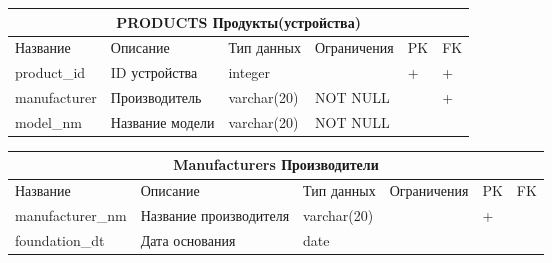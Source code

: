 \documentclass{article}
\begin{document}
\begin{tabular}{ |p{4cm}|p{4cm}|p{2.5cm}|p{3.5cm}|p{2cm}|p{1cm}| }
\hline
\multicolumn{6}{|c|}{PRODUCTS Продукты(устройства)} \\
\hline
Название & Описание & Тип данных & Ограничения & PK & FK\\
\hline
product\_id                         &   %
ID устройства                       &   %
integer                             &   %
                                    &   %
 +                                  &   %
 +                                  \\  %
\hline
manufacturer                        &   %
Производитель                       &   %
varchar(20)                         &   %
NOT NULL                            &   %
                                    &   %
 +                                  \\  %
\hline
model\_nm                           &   %
Название модели                     &   %
varchar(20)                         &   %
NOT NULL                            &   %
                                    &   %
                                    \\  %
\hline
\end{tabular}

\begin{tabular}{ |p{4cm}|p{4cm}|p{2.5cm}|p{3.5cm}|p{2cm}|p{1cm}| }
\hline
\multicolumn{6}{|c|}{Manufacturers Производители} \\
\hline
Название & Описание & Тип данных & Ограничения & PK & FK\\
\hline
manufacturer\_nm                    &   %
Название производителя              &   %
varchar(20)                         &   %
                                    &   %
 +                                  &   %
                                    \\  %
\hline
foundation\_dt                      &   %
Дата основания                      &   %
date                                &   %
                                    &   %
                                    &   %
                                    \\  %
\hline
\end{tabular}
\end{document}
